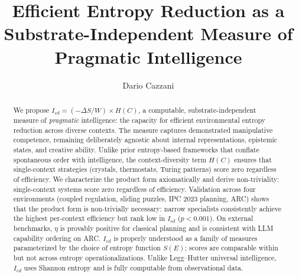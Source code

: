 \documentclass[runningheads,a4paper]{llncs}
\begin{document}

\title{Efficient Entropy Reduction as a Substrate-Independent Measure of Pragmatic Intelligence}

\author{Dario Cazzani}

\maketitle

\begin{abstract}
We propose $I_{cd} {=} (-\Delta S / W) {\times} H(C)$, a computable, substrate-independent measure of \emph{pragmatic} intelligence: the capacity for efficient environmental entropy reduction across diverse contexts. The measure captures demonstrated manipulative competence, remaining deliberately agnostic about internal representations, epistemic states, and creative ability. Unlike prior entropy-based frameworks that conflate spontaneous order with intelligence, the context-diversity term $H(C)$ ensures that single-context strategies (crystals, thermostats, Turing patterns) score zero regardless of efficiency. We characterize the product form axiomatically and derive non-triviality: single-context systems score zero regardless of efficiency. Validation across four environments (coupled regulation, sliding puzzles, IPC 2023 planning, ARC) shows that the product form is non-trivially necessary: narrow specialists consistently achieve the highest per-context efficiency but rank low in $I_{cd}$ ($p < 0.001$). On external benchmarks, $\eta$ is provably positive for classical planning and is consistent with LLM capability ordering on ARC. $I_{cd}$ is properly understood as a family of measures parameterized by the choice of entropy function $S(E)$; scores are comparable within but not across entropy operationalizations. Unlike Legg--Hutter universal intelligence, $I_{cd}$ uses Shannon entropy and is fully computable from observational data.
\end{abstract}
\end{document}
